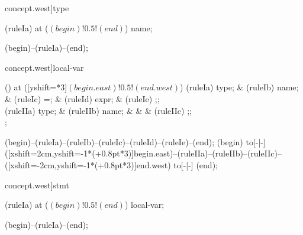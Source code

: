 \begin{syntax}[[xshift=22mm]concept.west]{type}
  
  \node[terminal] (ruleIa) at ($(begin)!0.5!(end)$) {name};
  
  \draw[path] (begin)--(ruleIa)--(end);
\end{syntax}
\begin{syntax}[[xshift=22mm]concept.west]{local-var}
  
  \node[sequence,anchor=north] () at ([yshift=\syntaxrulenodeheight-0.8pt*3]$(begin.east)!0.5!(end.west)$) {
    \node[nonterminal] (ruleIa) {type};
    &
    \node[terminal]    (ruleIb) {name};
    &
    \node[terminal]    (ruleIc) {=};
    &
    \node[nonterminal] (ruleId) {expr};
    &
    \node[terminal]    (ruleIe) {;};
    \\
    \node[nonterminal] (ruleIIa) {type};
    &
    \node[terminal]    (ruleIIb) {name};
    &
    &
    &
    \node[terminal]    (ruleIIc) {;};
    \\
  };
  
  \draw[path] (begin)--(ruleIa)--(ruleIb)--(ruleIc)--(ruleId)--(ruleIe)--(end);
  \draw[path] (begin) to[-|-] ([xshift=2cm,yshift=-1*(\syntaxruledist+0.8pt*3)]begin.east)--(ruleIIa)--(ruleIIb)--(ruleIIc)--([xshift=-2cm,yshift=-1*(\syntaxruledist+0.8pt*3)]end.west) to[-|-] (end);
\end{syntax}
\begin{syntax}[[xshift=22mm]concept.west]{stmt}
  
  \node[nonterminal] (ruleIa) at ($(begin)!0.5!(end)$) {local-var};
  
  \draw[path] (begin)--(ruleIa)--(end);
\end{syntax}

